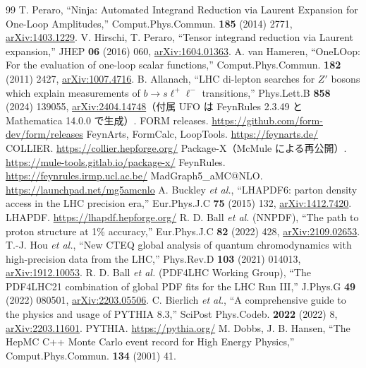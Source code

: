 \documentclass[a4paper,10pt]{ltjsarticle}
\begin{document}
\begin{thebibliography}{99}
 T. Peraro, ``Ninja: Automated Integrand Reduction via Laurent Expansion for One-Loop Amplitudes,'' Comput.Phys.Commun. \textbf{185} (2014) 2771, \href{https://arxiv.org/abs/1403.1229}{arXiv:1403.1229}.
 V. Hirschi, T. Peraro, ``Tensor integrand reduction via Laurent expansion,'' JHEP \textbf{06} (2016) 060, \href{https://arxiv.org/abs/1604.01363}{arXiv:1604.01363}.
 A. van Hameren, ``OneLOop: For the evaluation of one-loop scalar functions,'' Comput.Phys.Commun. \textbf{182} (2011) 2427, \href{https://arxiv.org/abs/1007.4716}{arXiv:1007.4716}.
 B. Allanach, ``LHC di-lepton searches for $Z'$ bosons which explain measurements of $b\to s\ell^+\ell^-$ transitions,'' Phys.Lett.B \textbf{858} (2024) 139055, \href{https://arxiv.org/abs/2404.14748}{arXiv:2404.14748}（付属 UFO は FeynRules 2.3.49 と Mathematica 14.0.0 で生成）.
 FORM releases. \url{https://github.com/form-dev/form/releases}
 FeynArts, FormCalc, LoopTools. \url{https://feynarts.de/}
 COLLIER. \url{https://collier.hepforge.org/}
 Package-X（McMule による再公開）. \url{https://mule-tools.gitlab.io/package-x/}
 FeynRules. \url{https://feynrules.irmp.ucl.ac.be/}
 MadGraph5\_aMC@NLO. \url{https://launchpad.net/mg5amcnlo}
 A. Buckley \textit{et al.}, ``LHAPDF6: parton density access in the LHC precision era,'' Eur.Phys.J.C \textbf{75} (2015) 132, \href{https://arxiv.org/abs/1412.7420}{arXiv:1412.7420}.
 LHAPDF. \url{https://lhapdf.hepforge.org/}
 R. D. Ball \textit{et al.} (NNPDF), ``The path to proton structure at 1\% accuracy,'' Eur.Phys.J.C \textbf{82} (2022) 428, \href{https://arxiv.org/abs/2109.02653}{arXiv:2109.02653}.
 T.-J. Hou \textit{et al.}, ``New CTEQ global analysis of quantum chromodynamics with high-precision data from the LHC,'' Phys.Rev.D \textbf{103} (2021) 014013, \href{https://arxiv.org/abs/1912.10053}{arXiv:1912.10053}.
 R. D. Ball \textit{et al.} (PDF4LHC Working Group), ``The PDF4LHC21 combination of global PDF fits for the LHC Run III,'' J.Phys.G \textbf{49} (2022) 080501, \href{https://arxiv.org/abs/2203.05506}{arXiv:2203.05506}.
 C. Bierlich \textit{et al.}, ``A comprehensive guide to the physics and usage of PYTHIA 8.3,'' SciPost Phys.Codeb. \textbf{2022} (2022) 8, \href{https://arxiv.org/abs/2203.11601}{arXiv:2203.11601}.
 PYTHIA. \url{https://pythia.org/}
 M. Dobbs, J. B. Hansen, ``The HepMC C++ Monte Carlo event record for High Energy Physics,'' Comput.Phys.Commun. \textbf{134} (2001) 41.

\end{thebibliography}
\end{document}
